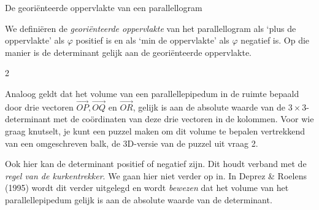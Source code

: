 \begin{lesactiviteit}{De georiënteerde oppervlakte van een parallellogram}
$ $

\begin{kader}{}{}

We definiëren de \emph{georiënteerde oppervlakte} van het parallellogram als `plus de oppervlakte' als $\varphi$ positief is en als `min de oppervlakte' als $\varphi$ negatief is. Op die manier is de determinant gelijk aan de georiënteerde oppervlakte.

\end{kader}
    
\end{lesactiviteit}

\begin{multicols}{2}
    
Analoog geldt dat het volume van een parallellepipedum in de ruimte bepaald door drie vectoren $\overrightarrow{OP}, \overrightarrow{OQ}$ en $\overrightarrow{OR}$, gelijk is aan de absolute waarde van de $3\times 3$- determinant met de coördinaten van deze drie vectoren in de kolommen. Voor wie graag knutselt, je kunt een puzzel maken om dit volume te bepalen vertrekkend van een omgeschreven balk, de 3D-versie van de puzzel uit vraag 2.


Ook hier kan de determinant positief of negatief zijn. Dit houdt verband met de \emph{regel van de kurkentrekker}. We gaan hier niet verder op in. In Deprez \& Roelens (1995) wordt dit verder uitgelegd en wordt \emph{bewezen} dat het volume van het parallellepipedum gelijk is aan de absolute waarde van de determinant.



 



\end{multicols}

